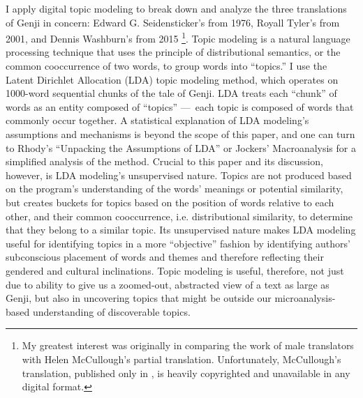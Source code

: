 \documentclass[12pt]{article}
\begin{document}
\begin{flushleft}
\begin{spacing}{2.0}
I apply digital topic modeling to break down and analyze the three translations of Genji in concern: Edward G. Seidensticker's from 1976, Royall Tyler's from 2001, and Dennis Washburn's from 2015 \footnote{ My greatest interest was originally in comparing the work of male translators with Helen McCullough's partial translation. Unfortunately, McCullough's translation, published only in , is heavily copyrighted and unavailable in any digital format.}. Topic modeling is a natural language processing technique that uses the principle of distributional semantics, or the common cooccurrence of two words, to group words into ``topics.'' I use the Latent Dirichlet Allocation (LDA) topic modeling method, which operates on 1000-word sequential chunks of the tale of Genji. LDA treats each ``chunk'' of words as an entity composed of ``topics'' --- each topic is composed of words that commonly occur together. A statistical explanation of LDA modeling's assumptions and mechanisms is beyond the scope of this paper, and one can turn to Rhody's ``Unpacking the Assumptions of LDA'' or Jockers' Macroanalysis for a simplified analysis of the method. Crucial to this paper and its discussion, however, is LDA modeling's unsupervised nature. Topics are not produced based on the program's understanding of the words' meanings or potential similarity, but creates buckets for topics based on the position of words relative to each other, and their common cooccurrence, i.e. distributional similarity, to determine that they belong to a similar topic. Its unsupervised nature makes LDA modeling useful for identifying topics in a more ``objective'' fashion by identifying authors' subconscious placement of words and themes and therefore reflecting their gendered and cultural inclinations. Topic modeling is useful, therefore, not just due to ability to give us a zoomed-out, abstracted view of a text as large as Genji, but also in uncovering topics that might be outside our microanalysis-based understanding of discoverable topics.


\end{spacing}
\end{flushleft}
\end{document}
